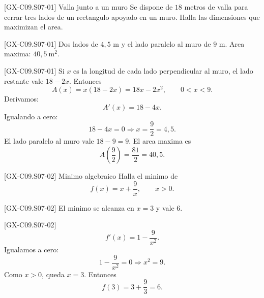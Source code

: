 \begin{guidedexercise}{[GX-C09.S07-01] Valla junto a un muro}
Se dispone de \(18\) metros de valla para cerrar tres lados de un rectangulo apoyado en un
muro. Halla las dimensiones que maximizan el area.
\end{guidedexercise}

\begin{shortanswer}{[GX-C09.S07-01]}
Dos lados de \(4{,}5\) m y el lado paralelo al muro de \(9\) m. Area maxima:
\(40{,}5\ \text{m}^2\).
\end{shortanswer}

\begin{fullsolution}{[GX-C09.S07-01]}
Si \(x\) es la longitud de cada lado perpendicular al muro, el lado restante vale \(18-2x\).
Entonces
\[
A(x)=x(18-2x)=18x-2x^2,\qquad 0<x<9.
\]
Derivamos:
\[
A'(x)=18-4x.
\]
Igualando a cero:
\[
18-4x=0 \Longrightarrow x=\frac{9}{2}=4{,}5.
\]
El lado paralelo al muro vale \(18-9=9\). El area maxima es
\[
A\left(\frac{9}{2}\right)=\frac{81}{2}=40{,}5.
\]
\end{fullsolution}

\begin{guidedexercise}{[GX-C09.S07-02] Minimo algebraico}
Halla el minimo de
\[
f(x)=x+\frac{9}{x},\qquad x>0.
\]
\end{guidedexercise}

\begin{shortanswer}{[GX-C09.S07-02]}
El minimo se alcanza en \(x=3\) y vale \(6\).
\end{shortanswer}

\begin{fullsolution}{[GX-C09.S07-02]}
\[
f'(x)=1-\frac{9}{x^2}.
\]
Igualamos a cero:
\[
1-\frac{9}{x^2}=0 \Longrightarrow x^2=9.
\]
Como \(x>0\), queda \(x=3\). Entonces
\[
f(3)=3+\frac{9}{3}=6.
\]
\end{fullsolution}

